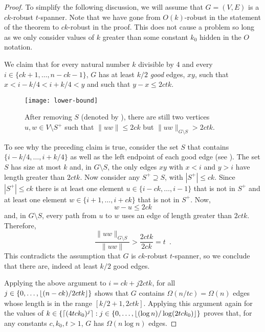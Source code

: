 \documentclass{sig-alternate}
\begin{document}
\begin{proof}
  To simplify the following discussion, we will assume that $G=(V,E)$ is
  a $ck$-robust $t$-spanner.  Note that we have gone from $O(k)$-robust
  in the statement of the theorem to $ck$-robust in the proof.  This does
  not cause a problem so long as we only consider values of $k$ greater
  than some constant $k_0$ hidden in the $O$ notation.

  We claim that for every natural number $k$ divisible by 4 and every
  $i\in\{ck+1,\ldots,n-ck-1\}$, $G$ has at least $k/2$ \emph{good} edges,
  $xy$, such that $x < i-k/4 < i+k/4 < y$ and such that $y-x \le 2ctk$.

  \begin{figure*}
    \begin{center}\texttt{[image: lower-bound]}\end{center}
    \caption{After removing $S$ (denoted by \textbullet), there are
      still two vertices $u,w\in V\setminus S^+$ such that $\|uw\|\le 2ck$
      but $\|uw\|_{G\setminus S} > 2ctk$.}
  \end{figure*}
  To see why the preceding claim is true, consider the set $S$ that
  contains $\{i-k/4,\ldots,i+k/4\}$ as well as the left endpoint of each
  good edge (see ).  The set $S$ has size at most
  $k$ and, in $G\setminus S$, the only edges $xy$ with $x<i$ and $y>i$
  have length greater than $2ctk$.  Now consider any $S^+\supseteq S$,
  with $|S^+|\le ck$.  Since $|S^+|\le ck$ there is at least one element
  $u\in\{i-ck,\ldots,i-1\}$ that is not in $S^+$ and at least one element
  $w\in\{i+1,\ldots,i+ck\}$ that is not in $S^+$.  Now,
  \[    w-u \le 2ck \]
  and, in $G\setminus S$, every path from $u$ to $w$ uses an edge of length
  greater than $2ctk$.  Therefore,
  \[
     \frac{\|uw\|_{G\setminus S}}{\|uw\|} > \frac{2ctk}{2ck} = t \enspace .
  \]
  This contradicts the assumption that $G$ is $ck$-robust $t$-spanner, so we
  conclude that there are, indeed at least $k/2$ good edges.
  
  Applying the above argument to $i=ck+j2ctk$, for all 
  $j\in\{0,\ldots,{\lfloor (n-ck)/2ctk \rfloor}\}$
  shows that $G$ contains
  $\Omega(n/tc)=\Omega(n)$ edges whose length is in the range
  $[k/2+1,2ctk]$.  Applying this argument again for the values of $k\in\{{\lceil (4tck_0)^{j} \rceil}
  : j\in\{0,\ldots,{\lfloor (\log n)/\log(2tck_0) \rfloor}\}$ proves that, for
  any constants $c,k_0,t>1$, $G$ has $\Omega(n\log n)$ edges.
\end{proof}
\end{document}
